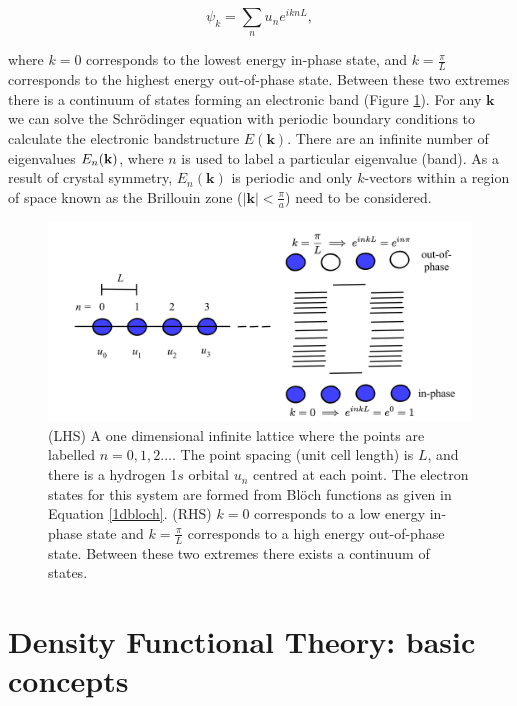\begin{equation} \label{1dbloch}
\psi_k = \sum_nu_ne^{iknL},
\end{equation}

where $k=0$ corresponds to the lowest energy in-phase state, and $k=\frac{\pi}{L}$ corresponds to the highest energy out-of-phase state.
Between these two extremes there is a continuum of states forming an electronic band (Figure \ref{bands}). 
For any $\textbf{k}$ we can solve the Schr\"{o}dinger equation with periodic boundary conditions to calculate the electronic bandstructure $E(\textbf{k})$. There are an infinite number of eigenvalues $E_n(\textbf{\textbf{k}})$, where $n$ is used to label a particular eigenvalue (band). As a result of crystal symmetry, $E_n(\textbf{k})$ is periodic and only $k$-vectors within a region of space known as the Brillouin zone ($|\textbf{k}|<\frac{\pi}{a}$) need to be considered.\autocite{Lundstrom2000} 

\begin{figure}[h]
\centering
  \includegraphics[width=1.0\columnwidth]{figures/ch3/bands.png}
  \caption[In-phase and out-of-phase states in an infinite 1D crystal]{(LHS) A one dimensional infinite lattice where the points are labelled $n=0,1,2\ldots$. The point spacing (unit cell length) is $L$, and there is a hydrogen 1$s$ orbital $u_n$ centred at each point. The electron states for this system are formed from Bl\"{o}ch functions as given in Equation \ref{1dbloch}. (RHS) $k=0$ corresponds to a low energy in-phase state and $k=\frac{\pi}{L}$ corresponds to a high energy out-of-phase state. Between these two extremes there exists a continuum of states.} 
  \label{bands}
\end{figure}

\section{Density Functional Theory: basic concepts} \label{DFTtheory}

